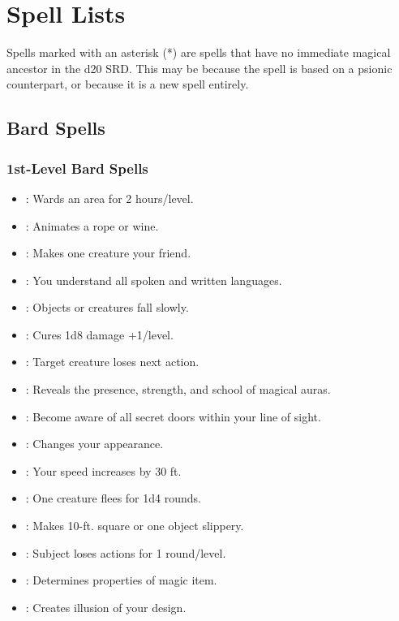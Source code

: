 \section{Spell Lists}
\label{sec:Spells}
Spells marked with an asterisk (*) are spells that have no immediate magical ancestor in the d20 SRD.
This may be because the spell is based on a psionic counterpart, or because it is a new spell entirely.
\subsection{Bard Spells}
\label{sec:BardSpells}
\subsubsection{1st-Level Bard Spells}
\begin{itemize}
\item {}: Wards an area for 2 hours/level.
\item {}: Animates a rope or wine.
\item {}: Makes one creature your friend.
\item {}: You understand all spoken and written languages.
\item {}: Objects or creatures fall slowly.
\item {}: Cures 1d8 damage +1/level.
\item {}: Target creature loses next action.
\item {}: Reveals the presence, strength, and school of magical auras.
\item {}: Become aware of all secret doors within your line of sight.
\item {}: Changes your appearance.
\item {}: Your speed increases by 30 ft.
\item {}: One creature flees for 1d4 rounds.
\item {}: Makes 10-ft. square or one object slippery.
\item {}: Subject loses actions for 1 round/level.
\item {}: Determines properties of magic item.
\item {}: Creates illusion of your design.

\end{itemize}
